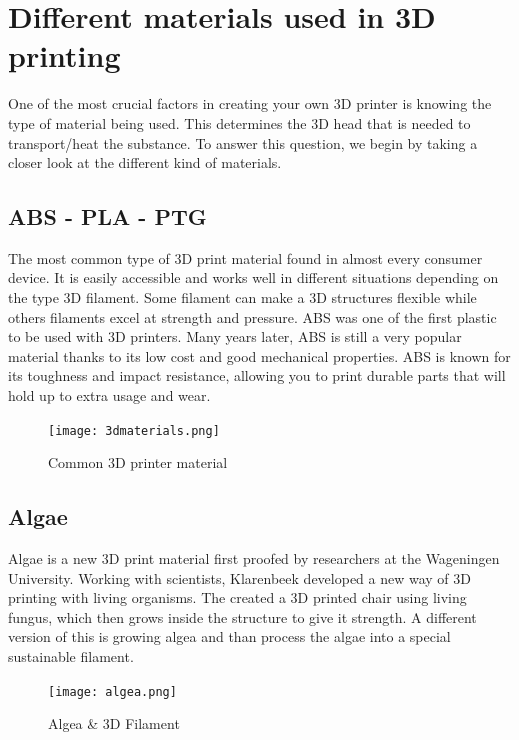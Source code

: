 \documentclass[11pt]{article}
\begin{document}
\newpage


\section{Different materials used in 3D printing}	
One of the most crucial factors in creating your own 3D printer is knowing the type of material being used. This determines the 3D head that is needed to transport/heat the substance. To answer this question, we begin by taking a closer look at the different kind of materials. 

\subsection{ABS - PLA - PTG}
			
	The most common type of 3D print material found in almost every consumer device. It is easily  accessible and works well in different situations depending on the type 3D filament. Some filament can make a 3D structures flexible while others filaments excel at strength and pressure. ABS was one of the first plastic to be used with 3D printers. Many years later, ABS is still a very popular material thanks to its low cost and good mechanical properties. ABS is known for its toughness and impact resistance, allowing you to print durable parts that will hold up to extra usage and wear.  \\
	
\begin{figure}[hbtp]
\caption{Common 3D printer material}
\centering
\texttt{[image: 3dmaterials.png]}
\end{figure}

	
\subsection{Algae}    
	Algae is a new 3D print material first proofed by researchers at the Wageningen University. Working with scientists, Klarenbeek  developed a new way of 3D printing with living organisms. The created a 3D printed chair using living fungus, which then grows inside the structure to give it strength.  A different version of this is growing algea and than process the algae into a special sustainable filament.\\
	
	\begin{figure}[hbtp]
	\caption{Algea \& 3D Filament}
	\centering
	\texttt{[image: algea.png]}
	\end{figure}
	
\end{document}
